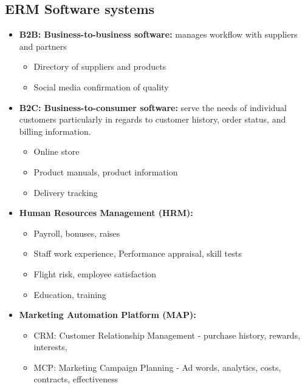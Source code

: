 \documentclass[]{book}
\providecommand{\tightlist}{%
  \setlength{\itemsep}{0pt}\setlength{\parskip}{0pt}}
\let\BeginKnitrBlock\begin \let\EndKnitrBlock\end
\begin{document}
\BeginKnitrBlock{rmdextra}
\hypertarget{erm-software-systems}{%
\section*{ERM Software systems}\label{erm-software-systems}}

\begin{itemize}
\item
  \textbf{B2B: Business-to-business software:} manages workflow with suppliers and partners

  \begin{itemize}
  \tightlist
  \item
    Directory of suppliers and products
  \item
    Social media confirmation of quality
  \end{itemize}
\item
  \textbf{B2C: Business-to-consumer software:} serve the needs of individual customers particularly in regards to customer history, order status, and billing information.

  \begin{itemize}
  \tightlist
  \item
    Online store
  \item
    Product manuals, product information
  \item
    Delivery tracking
  \end{itemize}
\item
  \textbf{Human Resources Management (HRM):}

  \begin{itemize}
  \tightlist
  \item
    Payroll, bonuses, raises
  \item
    Staff work experience, Performance appraisal, skill tests
  \item
    Flight risk, employee satisfaction
  \item
    Education, training
  \end{itemize}
\item
  \textbf{Marketing Automation Platform (MAP):}

  \begin{itemize}
  \tightlist
  \item
    CRM: Customer Relationship Management - purchase history, rewards, interests,
  \item
    MCP: Marketing Campaign Planning - Ad words, analytics, costs, contracts, effectiveness
  \end{itemize}
\end{itemize}
\EndKnitrBlock{rmdextra}
\end{document}
